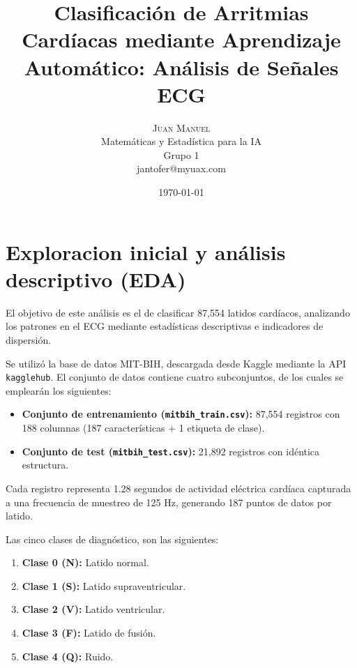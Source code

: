 \documentclass[a4paper,twocolumn]{article}
\title{Clasificación de Arritmias Cardíacas mediante Aprendizaje Automático: Análisis de Señales ECG} %
\author{%
	\textsc{Juan Manuel} \\[1ex] %
	\normalsize Matemáticas y Estadística para la IA\\
	\normalsize Grupo 1 \\ %
	\normalsize jantofer@myuax.com %
}
\date{\today} %
\begin{document}
		\maketitle
	
	
	\section{Exploracion inicial y análisis descriptivo (EDA)}
	\label{sec:eda}

		El objetivo de este análisis es el de clasificar 87,554 latidos cardíacos, analizando los patrones en el ECG mediante estadísticas descriptivas e indicadores de dispersión.

		\vspace{0.2cm}

		Se utilizó la base de datos MIT-BIH, descargada desde Kaggle mediante la API \texttt{kagglehub}. El conjunto de datos contiene cuatro subconjuntos, de los cuales se emplearán los siguientes:
		
		\vspace{0.2cm}

		\begin{itemize}
			\item \textbf{Conjunto de entrenamiento (\texttt{mitbih\_train.csv}):} 87,554 registros con 188 columnas (187 características + 1 etiqueta de clase).
			\item \textbf{Conjunto de test (\texttt{mitbih\_test.csv}):} 21,892 registros con idéntica estructura.
		\end{itemize}

		\vspace{0.2cm}

		Cada registro representa 1.28 segundos de actividad eléctrica cardíaca capturada a una frecuencia de muestreo de 125 Hz, generando 187 puntos de datos por latido.
 
		\vspace{0.2cm}

		Las cinco clases de diagnóstico, son las siguientes:
		\begin{enumerate}
			\item \textbf{Clase 0 (N):} Latido normal.
			\item \textbf{Clase 1 (S):} Latido supraventricular.
			\item \textbf{Clase 2 (V):} Latido ventricular.
			\item \textbf{Clase 3 (F):} Latido de fusión.
			\item \textbf{Clase 4 (Q):} Ruido.
		\end{enumerate}
\end{document}

